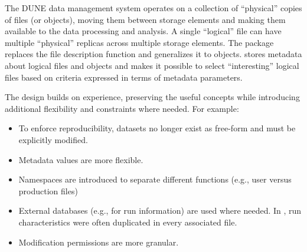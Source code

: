 \documentclass[../main-v1.tex]{subfiles}
\begin{document}
 
The DUNE data  management system operates on a collection of ``physical'' copies of files (or objects), moving them between storage elements and making them available to the data processing and analysis. 
A single  ``logical'' file can have multiple ``physical'' replicas across multiple storage elements. The  package replaces the  file description function and generalizes it to objects.  
 stores metadata about logical files and objects and makes it possible to select ``interesting'' logical files based on criteria expressed in terms of metadata parameters. 

The  design builds on  experience, preserving the useful concepts while introducing additional flexibility and constraints where needed.   For example:

\begin{itemize}  
\item To enforce reproducibility, %
datasets no longer exist as free-form and must be explicitly modified.
\item Metadata values are more flexible.
\item Namespaces are introduced to separate different functions (e.g., user %
versus production files)
\item External databases (e.g., for run information) are used where needed.  In , run characteristics were often duplicated in every associated file.
\item Modification permissions are more granular.
\end{itemize} 
\end{document}
